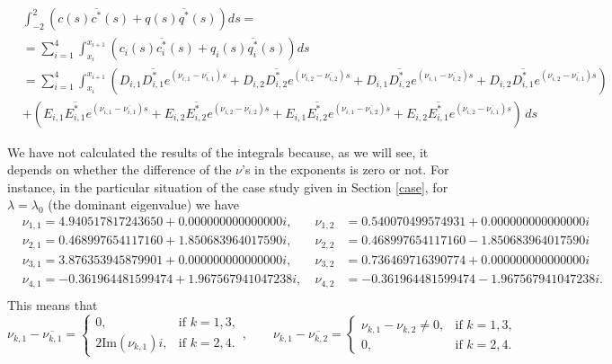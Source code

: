\documentclass[a4paper]{article}
\def\Im{{\textrm{Im}}}
\newcommand{\X}[3]{#1_{#3,#2}}
\newcommand{\Xe}[3]{#1^*_{#3,#2}}
\numberwithin{equation}{section}
\begin{document}
\begin{enumerate}
    \begin{align*}
    & \int_{-2}^{2} (c(s) \overline{c^*}(s)+q(s) \overline{q^*}(s)) ds =\\
    & =\sum_{i=1}^4 \int_{x_i}^{x_{i+1}} (c_i(s) \overline{c_i^{*}}(s)+q_i(s) \overline{q_i^{*}}(s)) ds \\
    & = \sum_{i=1}^4 \int_{x_i}^{x_{i+1}}\left( \X{D}{1}{i} \overline{\Xe{D}{1}{i}} e^{\left( \X{\nu}{1}{i}-\overline{\X{\nu}{1}{i}}\right) s} + \X{D}{2}{i} \overline{\Xe{D}{2}{i}} e^{\left( \X{\nu}{2}{i}-\overline{\X{\nu}{2}{i}}\right) s} +\X{D}{1}{i} \overline{\Xe{D}{2}{i}} e^{\left( \X{\nu}{1}{i}-\overline{\X{\nu}{2}{i}}\right) s} +\X{D}{2}{i} \overline{\Xe{D}{1}{i}} e^{\left( \X{\nu}{2}{i}-\overline{\X{\nu}{1}{i}}\right) s}  \right)  \\
    & + \left( \X{E}{1}{i} \overline{\Xe{E}{1}{i}} e^{\left( \X{\nu}{1}{i}-\overline{\X{\nu}{1}{i}}\right) s} + \X{E}{2}{i} \overline{\Xe{E}{2}{i}} e^{\left( \X{\nu}{2}{i}-\overline{\X{\nu}{2}{i}}\right) s} +\X{E}{1}{i} \overline{\Xe{E}{2}{i}} e^{\left( \X{\nu}{1}{i}-\overline{\X{\nu}{2}{i}}\right) s} +\X{E}{2}{i} \overline{\Xe{E}{1}{i}} e^{\left( \X{\nu}{2}{i}-\overline{\X{\nu}{1}{i}}\right) s}  \right)\,ds    \end{align*}
\end{enumerate}
We have not calculated the results of the integrals because, as we will see, it depends on whether the difference of the $\nu$'s in the exponents is zero or not. For instance, in the particular situation of the case study given in Section \ref{case}, for $\lambda=\lambda_0$ (the dominant eigenvalue) we have
\begin{align*}
  &\X{\nu}{1}{1} = 4.940517817243650 + 0.000000000000000i,\  &\X{\nu}{2}{1} &= 0.540070499574931 + 0.000000000000000i\\
  &\X{\nu}{1}{2} = 0.468997654117160 + 1.850683964017590i,\  &\X{\nu}{2}{2} &=  0.468997654117160 - 1.850683964017590i \\
  &\X{\nu}{1}{3} = 3.876353945879901 + 0.000000000000000i,\  &\X{\nu}{2}{3} &=  0.736469716390774 + 0.000000000000000i \\
  &\X{\nu}{1}{4} = -0.361964481599474 + 1.967567941047238i,\ &\X{\nu}{2}{4} &=  -0.361964481599474 - 1.967567941047238i. \\
\end{align*}
This means that
\[
\X{\nu}{1}{k}-\overline{\X{\nu}{1}{k}} =
\begin{cases}
0, & \text{if } k=1,3, \\
2 \Im(\X{\nu}{1}{k}) i,  & \text{if } k=2,4.
\end{cases},\qquad \X{\nu}{1}{k}-\overline{\X{\nu}{2}{k}} =
\begin{cases}
\X{\nu}{1}{k}-\X{\nu}{2}{k} \neq 0, & \text{if } k=1,3, \\
0,  & \text{if } k=2,4.
\end{cases}
\]
\end{document}
